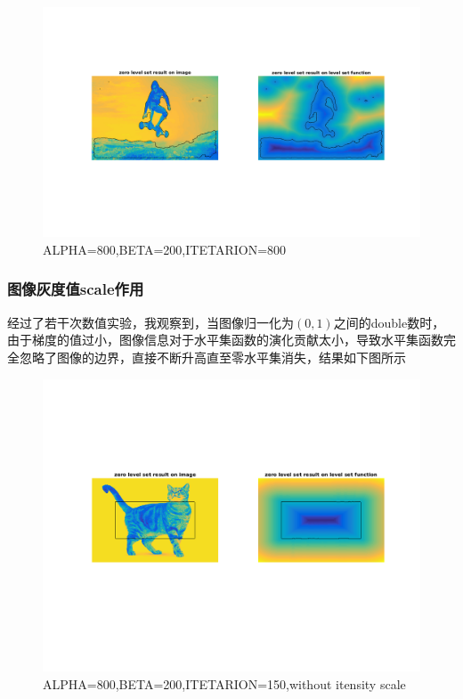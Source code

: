 \documentclass[a4paper, UTF8]{ctexrep}
\begin{document}
			\begin{figure}[htbp!]
				\centering
				\includegraphics[width=\textwidth]{hw3_fig8.png}
				\caption{ALPHA=800,BETA=200,ITETARION=800}
				\label{fig:figure1}
			\end{figure}
			\clearpage

		\subsubsection{图像灰度值scale作用} %
		\label{ssub:图像灰度值scale说明}
			经过了若干次数值实验，我观察到，当图像归一化为$\left( 0,1 \right)$之间的double数时，由于梯度的值过小，图像信息对于水平集函数的演化贡献太小，导致水平集函数完全忽略了图像的边界，直接不断升高直至零水平集消失，结果如下图所示
			\begin{figure}[htbp!]
				\centering
				\includegraphics[width=\textwidth]{hw3_fig9.png}
				\caption{ALPHA=800,BETA=200,ITETARION=150,without itensity scale}
				\label{fig:figure1}
			\end{figure}
			\clearpage
\end{document}
